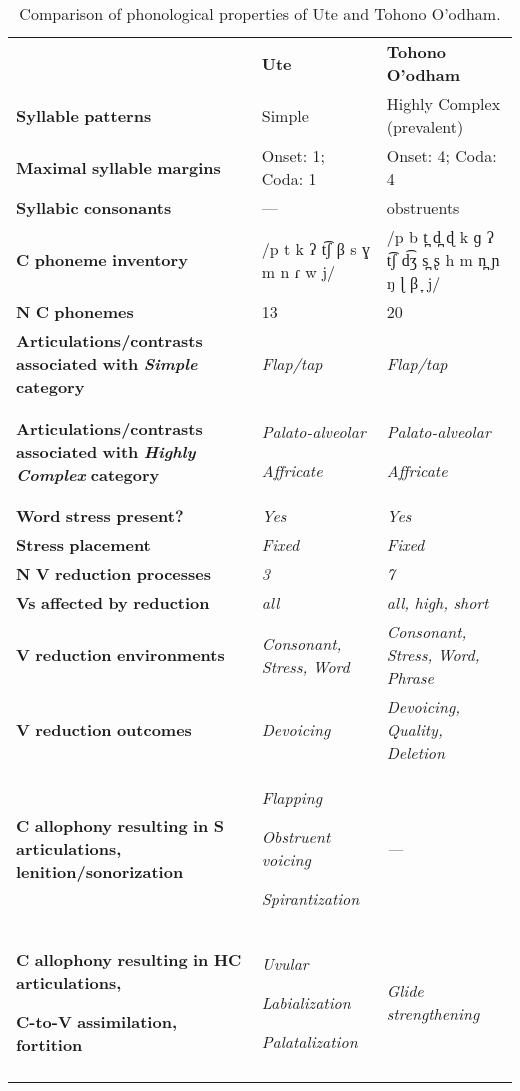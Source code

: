 \begin{table}
\begin{tabularx}{\textwidth}{XXX}
\lsptoprule
 & \textbf{Ute} & \textbf{Tohono} \textbf{O’odham}\\
 \textbf{Syllable} \textbf{patterns} & Simple & Highly Complex (prevalent)\\
 \textbf{Maximal} \textbf{syllable} \textbf{margins} & Onset: 1; Coda: 1 & Onset: 4; Coda: 4\\
 \textbf{Syllabic} \textbf{consonants} & — & obstruents\\
 \textbf{C} \textbf{phoneme} \textbf{inventory} & /p t k ʔ t͡ʃ β s ɣ m n ɾ w j/ & /p b t̪ d̪ ɖ k ɡ ʔ t͡ʃ d͡ʒ s̪ ʂ h m n̪ ɲ ŋ ɭ β ̞ j/\\
 \textbf{N} \textbf{C} \textbf{phonemes} & 13 & 20\\
 \textbf{Articulations/contrasts} \textbf{associated} \textbf{with} \textbf{\textit{Simple}} \textbf{category} & \textit{Flap/tap} & \textit{Flap/tap}\\
 \textbf{Articulations/contrasts} \textbf{associated} \textbf{with} \textbf{\textit{Highly} \textit{Complex}} \textbf{category} & { \textit{Palato-alveolar}}

 \textit{Affricate} & { \textit{Palato-alveolar}}

 \textit{Affricate}\\
 \textbf{Word} \textbf{stress} \textbf{present?} & \textit{Yes} & \textit{Yes}\\
 \textbf{Stress} \textbf{placement} & \textit{Fixed} & \textit{Fixed}\\
 \textbf{N} \textbf{V} \textbf{reduction} \textbf{processes} & \textit{3} & \textit{7}\\
 \textbf{Vs} \textbf{affected} \textbf{by} \textbf{reduction}  & \textit{all} & \textit{all,} \textit{high,} \textit{short}\\
 \textbf{V} \textbf{reduction} \textbf{environments} & \textit{Consonant,} \textit{Stress,} \textit{Word} & \textit{Consonant,} \textit{Stress,} \textit{Word,} \textit{Phrase}\\
 \textbf{V} \textbf{reduction} \textbf{outcomes} & \textit{Devoicing} & \textit{Devoicing,} \textit{Quality,} \textit{Deletion}\\
 \textbf{C} \textbf{allophony} \textbf{resulting} \textbf{in} \textbf{S} \textbf{articulations,} \textbf{lenition/sonorization} & { \textit{Flapping}}

{ \textit{Obstruent} \textit{voicing}}

 \textit{Spirantization} & \textit{—}\\
{ \textbf{C} \textbf{allophony} \textbf{resulting} \textbf{in} \textbf{HC} \textbf{articulations,} }

 \textbf{C-to-V} \textbf{assimilation,} \textbf{fortition} & { \textit{Uvular}}

{ \textit{Labialization}}

 \textit{Palatalization} & \textit{Glide} \textit{strengthening}\\
\lspbottomrule
\end{tabularx}
\caption{\label{8.2}Comparison of phonological properties of Ute and Tohono O’odham.}
\end{table}

